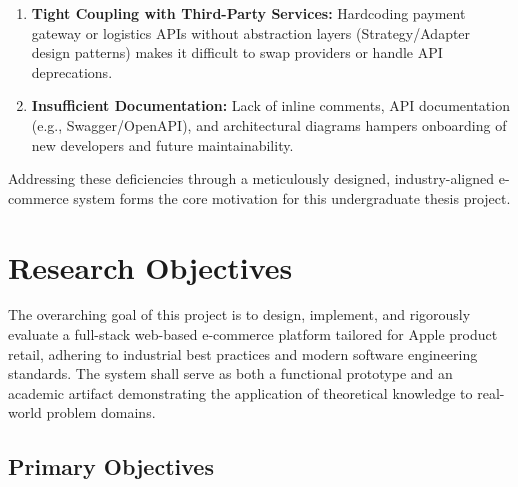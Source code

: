\begin{enumerate}
    \item \textbf{Tight Coupling with Third-Party Services:} Hardcoding payment gateway or logistics APIs without abstraction layers (Strategy/Adapter design patterns) makes it difficult to swap providers or handle API deprecations.
    
    \item \textbf{Insufficient Documentation:} Lack of inline comments, API documentation (e.g., Swagger/OpenAPI), and architectural diagrams hampers onboarding of new developers and future maintainability.
\end{enumerate}

\vspace{0.5cm}
\noindent Addressing these deficiencies through a meticulously designed, industry-aligned e-commerce system forms the core motivation for this undergraduate thesis project.

\section{Research Objectives}

The overarching goal of this project is to design, implement, and rigorously evaluate a full-stack web-based e-commerce platform tailored for Apple product retail, adhering to industrial best practices and modern software engineering standards. The system shall serve as both a functional prototype and an academic artifact demonstrating the application of theoretical knowledge to real-world problem domains.

\subsection{Primary Objectives}

